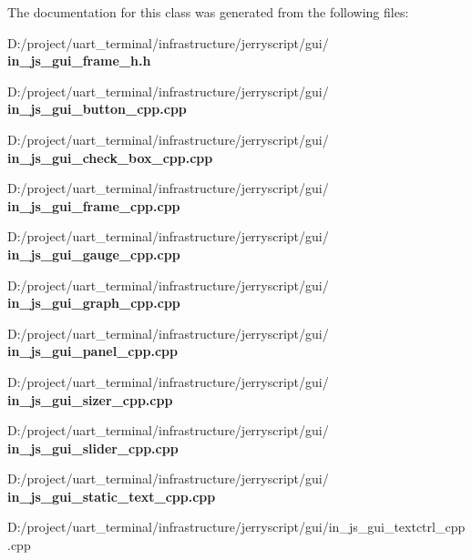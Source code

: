 The documentation for this class was generated from the following files\+:\begin{DoxyCompactItemize}
\item 
D\+:/project/uart\+\_\+terminal/infrastructure/jerryscript/gui/\textbf{ in\+\_\+js\+\_\+gui\+\_\+frame\+\_\+h.\+h}\item 
D\+:/project/uart\+\_\+terminal/infrastructure/jerryscript/gui/\textbf{ in\+\_\+js\+\_\+gui\+\_\+button\+\_\+cpp.\+cpp}\item 
D\+:/project/uart\+\_\+terminal/infrastructure/jerryscript/gui/\textbf{ in\+\_\+js\+\_\+gui\+\_\+check\+\_\+box\+\_\+cpp.\+cpp}\item 
D\+:/project/uart\+\_\+terminal/infrastructure/jerryscript/gui/\textbf{ in\+\_\+js\+\_\+gui\+\_\+frame\+\_\+cpp.\+cpp}\item 
D\+:/project/uart\+\_\+terminal/infrastructure/jerryscript/gui/\textbf{ in\+\_\+js\+\_\+gui\+\_\+gauge\+\_\+cpp.\+cpp}\item 
D\+:/project/uart\+\_\+terminal/infrastructure/jerryscript/gui/\textbf{ in\+\_\+js\+\_\+gui\+\_\+graph\+\_\+cpp.\+cpp}\item 
D\+:/project/uart\+\_\+terminal/infrastructure/jerryscript/gui/\textbf{ in\+\_\+js\+\_\+gui\+\_\+panel\+\_\+cpp.\+cpp}\item 
D\+:/project/uart\+\_\+terminal/infrastructure/jerryscript/gui/\textbf{ in\+\_\+js\+\_\+gui\+\_\+sizer\+\_\+cpp.\+cpp}\item 
D\+:/project/uart\+\_\+terminal/infrastructure/jerryscript/gui/\textbf{ in\+\_\+js\+\_\+gui\+\_\+slider\+\_\+cpp.\+cpp}\item 
D\+:/project/uart\+\_\+terminal/infrastructure/jerryscript/gui/\textbf{ in\+\_\+js\+\_\+gui\+\_\+static\+\_\+text\+\_\+cpp.\+cpp}\item 
D\+:/project/uart\+\_\+terminal/infrastructure/jerryscript/gui/in\+\_\+js\+\_\+gui\+\_\+textctrl\+\_\+cpp.\+cpp\end{DoxyCompactItemize}
